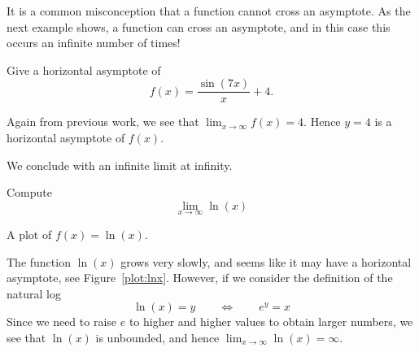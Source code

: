 It is a common misconception that a function cannot cross an
asymptote. As the next example shows, a function can cross an
asymptote, and in this case this occurs an infinite number of times!

\begin{example}
Give a horizontal asymptote of
\[
f(x) = \frac{\sin(7x)}{x}+4.
\]
\end{example}

\begin{solution}
Again from previous work, we see that $\lim_{x\to \infty} f(x) =
4$. Hence $y=4$ is a horizontal asymptote of $f(x)$.
\end{solution}


We conclude with an infinite limit at infinity.

\begin{example}
Compute
\[
\lim_{x\to \infty} \ln(x)
\]
\end{example}
\begin{marginfigure}[0in]
\caption{A plot of $f(x)=\ln(x)$.}
\label{plot:lnx}
\end{marginfigure}

\begin{solution}
The function $\ln(x)$ grows very slowly, and seems like it may have a
horizontal asymptote, see Figure~\ref{plot:lnx}. However, if we
consider the definition of the natural log
\[
\ln(x) = y \qquad \Leftrightarrow\qquad e^y =x
\]
Since we need to raise $e$ to higher and higher values to obtain
larger numbers, we see that $\ln(x)$ is unbounded, and hence
$\lim_{x\to\infty}\ln(x)=\infty$.
\end{solution}


